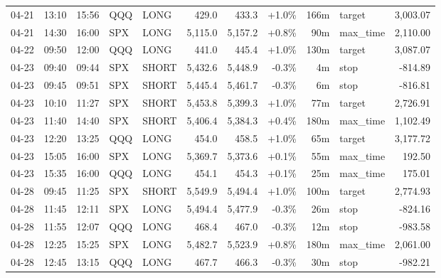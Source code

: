\documentclass[11pt,a4paper,twoside]{article}
\begin{document}
\begin{center}
\begin{longtable}{>{\color{txtmain}}l l l l l r r r r >{\color{txtmain}}l r}
04-21 & 13:10 & 15:56 & QQQ & LONG & 429.0 & 433.3 & \textcolor{wingreen}{+1.0\%} & 166m & target & \textcolor{wingreen}{3,003.07} \\
04-21 & 14:30 & 16:00 & SPX & LONG & 5,115.0 & 5,157.2 & \textcolor{wingreen}{+0.8\%} & 90m & max\_time & \textcolor{wingreen}{2,110.00} \\
04-22 & 09:50 & 12:00 & QQQ & LONG & 441.0 & 445.4 & \textcolor{wingreen}{+1.0\%} & 130m & target & \textcolor{wingreen}{3,087.07} \\
04-23 & 09:40 & 09:44 & SPX & SHORT & 5,432.6 & 5,448.9 & \textcolor{lossred}{-0.3\%} & 4m & stop & \textcolor{lossred}{-814.89} \\
04-23 & 09:45 & 09:51 & SPX & SHORT & 5,445.4 & 5,461.7 & \textcolor{lossred}{-0.3\%} & 6m & stop & \textcolor{lossred}{-816.81} \\
04-23 & 10:10 & 11:27 & SPX & SHORT & 5,453.8 & 5,399.3 & \textcolor{wingreen}{+1.0\%} & 77m & target & \textcolor{wingreen}{2,726.91} \\
04-23 & 11:40 & 14:40 & SPX & SHORT & 5,406.4 & 5,384.3 & \textcolor{wingreen}{+0.4\%} & 180m & max\_time & \textcolor{wingreen}{1,102.49} \\
04-23 & 12:20 & 13:25 & QQQ & LONG & 454.0 & 458.5 & \textcolor{wingreen}{+1.0\%} & 65m & target & \textcolor{wingreen}{3,177.72} \\
04-23 & 15:05 & 16:00 & SPX & LONG & 5,369.7 & 5,373.6 & \textcolor{wingreen}{+0.1\%} & 55m & max\_time & \textcolor{wingreen}{192.50} \\
04-23 & 15:35 & 16:00 & QQQ & LONG & 454.1 & 454.3 & \textcolor{wingreen}{+0.1\%} & 25m & max\_time & \textcolor{wingreen}{175.01} \\
04-28 & 09:45 & 11:25 & SPX & SHORT & 5,549.9 & 5,494.4 & \textcolor{wingreen}{+1.0\%} & 100m & target & \textcolor{wingreen}{2,774.93} \\
04-28 & 11:45 & 12:11 & SPX & LONG & 5,494.4 & 5,477.9 & \textcolor{lossred}{-0.3\%} & 26m & stop & \textcolor{lossred}{-824.16} \\
04-28 & 11:55 & 12:07 & QQQ & LONG & 468.4 & 467.0 & \textcolor{lossred}{-0.3\%} & 12m & stop & \textcolor{lossred}{-983.58} \\
04-28 & 12:25 & 15:25 & SPX & LONG & 5,482.7 & 5,523.9 & \textcolor{wingreen}{+0.8\%} & 180m & max\_time & \textcolor{wingreen}{2,061.00} \\
04-28 & 12:45 & 13:15 & QQQ & LONG & 467.7 & 466.3 & \textcolor{lossred}{-0.3\%} & 30m & stop & \textcolor{lossred}{-982.21} \\

\end{longtable}
\end{center}
\end{document}
